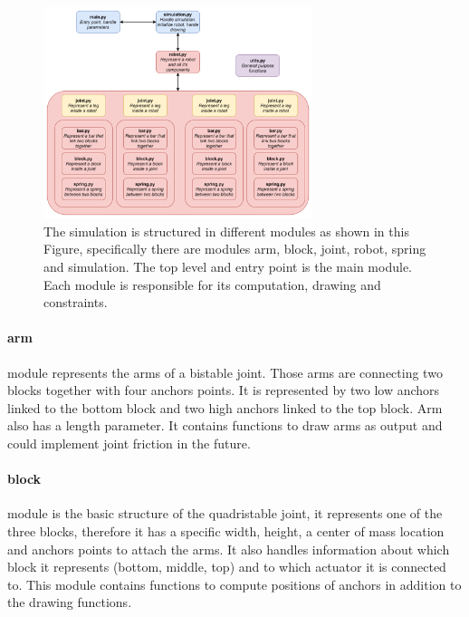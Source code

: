         \begin{figure}
            \centering
            \includegraphics[width=0.7\textwidth]{images/code_structure.png}
            \caption{The simulation is structured in different modules as shown in this Figure, specifically there are modules arm, block, joint, robot, spring and simulation. The top level and entry point is the main module. Each module is responsible for its computation, drawing and constraints.}
            \label{fig:code_structure}
        \end{figure}
        
        \paragraph{arm}
            module represents the arms of a bistable joint. Those arms are connecting two blocks together with four anchors points. It is represented by two low anchors linked to the bottom block and two high anchors linked to the top block. Arm also has a length parameter. It contains functions to draw arms as output and could implement joint friction in the future. 
        \paragraph{block}
            module is the basic structure of the quadristable joint, it represents one of the three blocks, therefore it has a specific width, height, a center of mass location and anchors points to attach the arms. It also handles information about which block it represents (bottom, middle, top) and to which actuator it is connected to. This module contains functions to compute positions of anchors in addition to the drawing functions.
